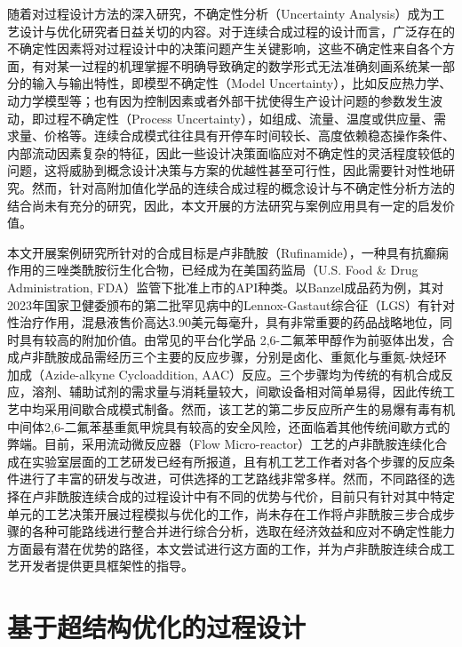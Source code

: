 随着对过程设计方法的深入研究，不确定性分析（Uncertainty Analysis）成为工艺设计与优化研究者日益关切的内容。对于连续合成过程的设计而言，广泛存在的不确定性因素将对过程设计中的决策问题产生关键影响，这些不确定性来自各个方面，有对某一过程的机理掌握不明确导致确定的数学形式无法准确刻画系统某一部分的输入与输出特性，即模型不确定性（Model Uncertainty），比如反应热力学、动力学模型等\cite{ulas2004}；也有因为控制因素或者外部干扰使得生产设计问题的参数发生波动，即过程不确定性（Process Uncertainty），如组成、流量、温度或供应量、需求量、价格等\cite{pisti1995}。连续合成模式往往具有开停车时间较长、高度依赖稳态操作条件、内部流动因素复杂的特征，因此一些设计决策面临应对不确定性的灵活程度较低的问题，这将威胁到概念设计决策与方案的优越性甚至可行性，因此需要针对性地研究。然而，针对高附加值化学品的连续合成过程的概念设计与不确定性分析方法的结合尚未有充分的研究，因此，本文开展的方法研究与案例应用具有一定的启发价值。

本文开展案例研究所针对的合成目标是卢非酰胺（Rufinamide），一种具有抗癫痫作用的三唑类酰胺衍生化合物，已经成为在美国药监局（U.S. Food \& Drug Administration, FDA）监管下批准上市的API种类。以Banzel成品药为例，其对2023年国家卫健委颁布的第二批罕见病中的Lennox-Gastaut综合征（LGS）有针对性治疗作用，混悬液售价高达3.90美元每毫升，具有非常重要的药品战略地位，同时具有较高的附加价值。由常见的平台化学品 {2,6-}二氟苯甲醇作为前驱体出发，合成卢非酰胺成品需经历三个主要的反应步骤，分别是卤化、重氮化与重氮-炔烃环加成（Azide-alkyne Cycloaddition, AAC）反应。三个步骤均为传统的有机合成反应，溶剂、辅助试剂的需求量与消耗量较大，间歇设备相对简单易得，因此传统工艺中均采用间歇合成模式制备。然而，该工艺的第二步反应所产生的易爆有毒有机中间体2,6-二氟苯基重氮甲烷具有较高的安全风险，还面临着其他传统间歇方式的弊端。目前，采用流动微反应器（Flow Micro-reactor）工艺的卢非酰胺连续化合成在实验室层面的工艺研发已经有所报道\cite{borukhova2016}，且有机工艺工作者对各个步骤的反应条件进行了丰富的研发与改进，可供选择的工艺路线非常多样。然而，不同路径的选择在卢非酰胺连续合成的过程设计中有不同的优势与代价，目前只有针对其中特定单元的工艺决策开展过程模拟与优化的工作\cite{diab2018}，尚未存在工作将卢非酰胺三步合成步骤的各种可能路线进行整合并进行综合分析，选取在经济效益和应对不确定性能力方面最有潜在优势的路径，本文尝试进行这方面的工作，并为卢非酰胺连续合成工艺开发者提供更具框架性的指导。


\section{基于超结构优化的过程设计}
